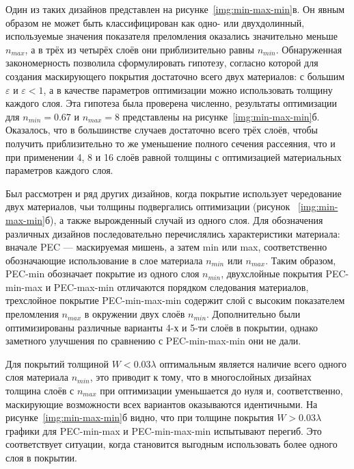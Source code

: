 Один из таких дизайнов представлен на
рисунке~\ref{img:min-max-min}в. Он явным образом не может быть
классифицирован как одно- или двухдолинный, используемые значения
показателя преломления оказались значительно меньше $n_{max}$, а в
трёх из четырёх слоёв они приблизительно равны $n_{min}$.
Обнаруженная закономерность позволила сформулировать гипотезу,
согласно которой для создания маскирующего покрытия достаточно
всего двух материалов: с большим $\varepsilon$ и
${\varepsilon<1}$, а в качестве параметров оптимизации можно
использовать толщину каждого слоя. Эта гипотеза была проверена
численно, результаты оптимизации для $n_{min}=0.67$ и $n_{max}=8$
представлены на рисунке~\ref{img:min-max-min}б. Оказалось, что в
большинстве случаев достаточно всего трёх слоёв, чтобы получить приблизительно то же
уменьшение полного сечения рассеяния, что и при применении 4, 8 и
16 слоёв равной толщины с оптимизацией материальных параметров каждого
слоя.

Был рассмотрен и ряд других дизайнов, когда покрытие использует
чередование двух материалов, чьи толщины подвергались оптимизации
(рисунок ~\ref{img:min-max-min}б), а также вырожденный случай
из одного слоя.  Для обозначения различных
дизайнов последовательно перечислялись характеристики материала:
вначале PEC --- маскируемая мишень, а затем min или max,
соответственно обозначающие использование в слое материала $n_{min}$
или $n_{max}$. Таким образом, PEC-min обозначает покрытие из одного
слоя $n_{min}$, двухслойные покрытия PEC-min-max и PEC-max-min
отличаются порядком следования материалов, трехслойное покрытие
PEC-min-max-min содержит слой с высоким показателем преломления
$n_{max}$ в окружении двух слоёв $n_{min}$. Дополнительно были
оптимизированы различные варианты 4-х и 5-ти слоёв в покрытии, однако
заметного улучшения по сравнению с PEC-min-max-min они не дали.

Для покрытий толщиной $W<0.03\lambda$ оптимальным является наличие
всего одного слоя материала $n_{min}$, это приводит к тому, что в
многослойных дизайнах толщина слоёв с $n_{max}$ при оптимизации
уменьшается до нуля и, соответственно, маскирующие возможности всех
вариантов оказываются идентичными. На
рисунке~\ref{img:min-max-min}б видно, что при толщине покрытия
$W>0.03\lambda$ графики для PEC-min-max и PEC-min-max-min испытывают
перегиб. Это соответствует ситуации, когда становится выгодным
использовать более одного слоя в покрытии.

